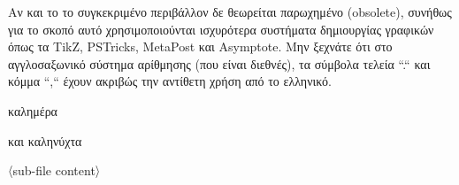 \documentclass
[
	varwidth=true,
	border=10pt,
	convert={inext=.pdf, outext=.png},
	preview,
	12pt,
	multi = true,
]
{standalone}
\begin{document}
\begin{myexm}

Αν και το το συγκεκριμένο περιβάλλον δε θεωρείται παρωχημένο (obsolete), συνήθως για το σκοπό αυτό χρησιμοποιούνται ισχυρότερα συστήματα δημιουργίας γραφικών όπως τα TikZ, PSTricks, MetaPost και Asymptote. Μην ξεχνάτε ότι στο αγγλοσαξωνικό σύστημα αρίθμησης (που είναι διεθνές), τα σύμβολα τελεία ``.`` και κόμμα ``,`` έχουν ακριβώς την αντίθετη χρήση από το ελληνικό.

\end{myexm}


\begin{mybeer}

καλημέρα

\end{mybeer}


\begin{mycar}

και καληνύχτα

\end{mycar}


\begin{standalone}

	〈sub-file content〉

\end{standalone}
\end{document}
